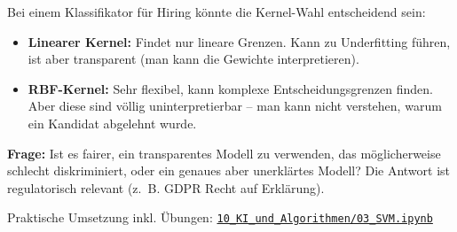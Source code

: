 
\begin{myexample}
Bei einem Klassifikator für Hiring könnte die Kernel-Wahl entscheidend sein:
\begin{itemize}
    \item \textbf{Linearer Kernel:} Findet nur lineare Grenzen. Kann zu Underfitting führen, ist aber transparent (man kann die Gewichte interpretieren).
    \item \textbf{RBF-Kernel:} Sehr flexibel, kann komplexe Entscheidungsgrenzen finden. Aber diese sind völlig uninterpretierbar -- man kann nicht verstehen, warum ein Kandidat abgelehnt wurde.
\end{itemize}
\textbf{Frage:} Ist es fairer, ein transparentes Modell zu verwenden, das möglicherweise schlecht diskriminiert, oder ein genaues aber unerklärtes Modell? Die Antwort ist regulatorisch relevant (z.~B. GDPR Recht auf Erklärung).
\end{myexample}

\begin{myremark}[Notebook]
Praktische Umsetzung inkl. Übungen:
\href{\notebookurl}{\texttt{10\_KI\_und\_Algorithmen/03\_SVM.ipynb}}
\end{myremark}
